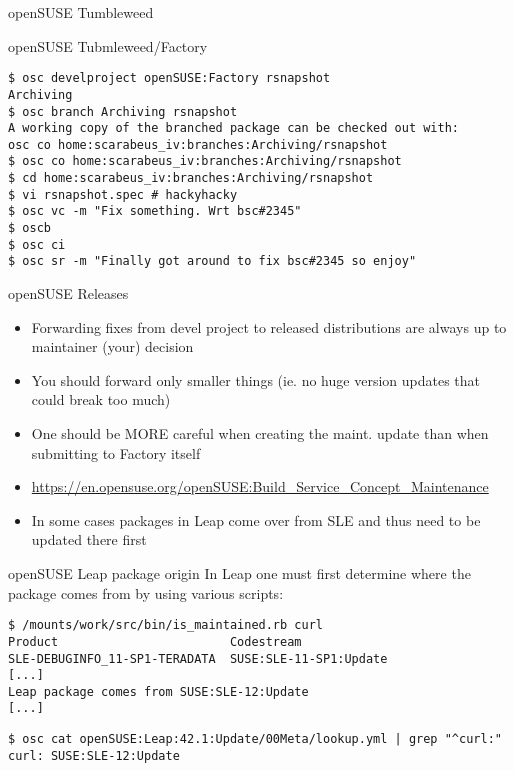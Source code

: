 \documentclass{beamer}
\begin{document}
\begin{frame}{openSUSE Tumbleweed}
\end{frame}

\begin{frame}[fragile]{openSUSE Tubmleweed/Factory}
	\begin{tiny}
	\begin{verbatim}
$ osc develproject openSUSE:Factory rsnapshot
Archiving
$ osc branch Archiving rsnapshot
A working copy of the branched package can be checked out with:
osc co home:scarabeus_iv:branches:Archiving/rsnapshot
$ osc co home:scarabeus_iv:branches:Archiving/rsnapshot
$ cd home:scarabeus_iv:branches:Archiving/rsnapshot
$ vi rsnapshot.spec # hackyhacky
$ osc vc -m "Fix something. Wrt bsc#2345"
$ oscb
$ osc ci
$ osc sr -m "Finally got around to fix bsc#2345 so enjoy"
	\end{verbatim}
	\end{tiny}
\end{frame}

\begin{frame}[t]{openSUSE Releases}
	\begin{itemize}
	\item Forwarding fixes from devel project to released distributions are always up to maintainer (your) decision
	\item You should forward only smaller things (ie. no huge version updates that could break too much)
	\item One should be MORE careful when creating the maint. update than when submitting to Factory itself
	\item \url{https://en.opensuse.org/openSUSE:Build\_Service\_Concept\_Maintenance}
	\item In some cases packages in Leap come over from SLE and thus need to be updated there first
	\end{itemize}
\end{frame}

\begin{frame}[fragile]{openSUSE Leap package origin}
In Leap one must first determine where the package comes from by using various
scripts:
\begin{small}
\begin{verbatim}$ /mounts/work/src/bin/is_maintained.rb curl
Product                        Codestream
SLE-DEBUGINFO_11-SP1-TERADATA  SUSE:SLE-11-SP1:Update
[...]
Leap package comes from SUSE:SLE-12:Update
[...]\end{verbatim}
\end{small}
\begin{small}
\begin{verbatim}$ osc cat openSUSE:Leap:42.1:Update/00Meta/lookup.yml | grep "^curl:"
curl: SUSE:SLE-12:Update\end{verbatim}
\end{small}
\end{frame}
\end{document}
